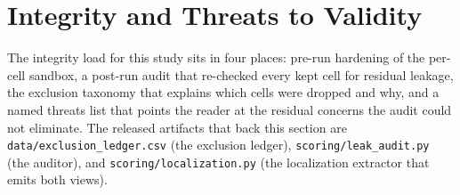 %
%
%

\section{Integrity and Threats to Validity}
\label{sec:integrity}

The integrity load for this study sits in four places: pre-run hardening of the per-cell
sandbox, a post-run audit that re-checked every kept cell for residual leakage, the
exclusion taxonomy that explains which cells were dropped and why, and a named threats list
that points the reader at the residual concerns the audit could not eliminate. The
released artifacts that back this section are \texttt{data/exclusion\_ledger.csv} (the
exclusion ledger), \texttt{scoring/leak\_audit.py} (the auditor), and
\texttt{scoring/localization.py} (the localization extractor that emits both views).

